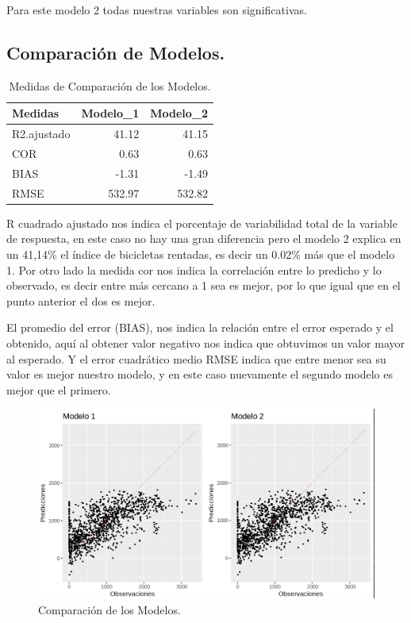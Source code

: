 \documentclass[]{elsarticle} %
\begin{document}
Para este modelo 2 todas nuestras variables son significativas.

\newpage
\subsection{Comparación de Modelos.}
\begin{table}

\caption{\label{tab:tab3}\label{tab:tab3}Medidas de Comparación de los Modelos.}
\centering
\begin{tabular}[t]{l|r|r}
\hline
Medidas & Modelo\_1 & Modelo\_2\\
\hline
R2.ajustado & 41.12 & 41.15\\
\hline
COR & 0.63 & 0.63\\
\hline
BIAS & -1.31 & -1.49\\
\hline
RMSE & 532.97 & 532.82\\
\hline
\end{tabular}
\end{table}

R cuadrado ajustado nos indica el porcentaje de variabilidad total de la
variable de respuesta, en este caso no hay una gran diferencia pero el
modelo 2 explica en un 41,14\% el índice de bicicletas rentadas, es
decir un 0.02\% más que el modelo 1. Por otro lado la medida cor nos
indica la correlación entre lo predicho y lo observado, es decir entre
más cercano a 1 sea es mejor, por lo que igual que en el punto anterior
el dos es mejor.

El promedio del error (BIAS), nos indica la relación entre el error
esperado y el obtenido, aquí al obtener valor negativo nos indica que
obtuvimos un valor mayor al esperado. Y el error cuadrático medio RMSE
indica que entre menor sea su valor es mejor nuestro modelo, y en este
caso nuevamente el segundo modelo es mejor que el primero.

\begin{figure}[H]

{\centering \includegraphics[width=1\linewidth]{compare_g} 

}

\caption{\label{fig:fig5} Comparación de los Modelos.}\label{fig:fig5}
\end{figure}
\end{document}
